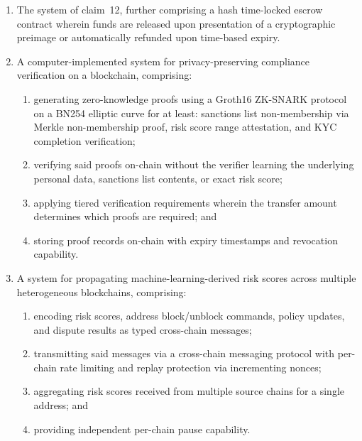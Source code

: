 \documentclass[12pt,a4paper]{article}
\begin{document}
\begin{enumerate}[label=\textbf{\arabic*.}, leftmargin=2em]
\item The system of claim~12, further comprising a hash time-locked escrow
contract wherein funds are released upon presentation of a cryptographic
preimage or automatically refunded upon time-based expiry.

\item A computer-implemented system for privacy-preserving compliance
verification on a blockchain, comprising:
\begin{enumerate}[label=(\alph*)]
  \item generating zero-knowledge proofs using a Groth16 ZK-SNARK protocol
    on a BN254 elliptic curve for at least: sanctions list non-membership via
    Merkle non-membership proof, risk score range attestation, and KYC
    completion verification;
  \item verifying said proofs on-chain without the verifier learning the
    underlying personal data, sanctions list contents, or exact risk score;
  \item applying tiered verification requirements wherein the transfer amount
    determines which proofs are required; and
  \item storing proof records on-chain with expiry timestamps and revocation
    capability.
\end{enumerate}

\item A system for propagating machine-learning-derived risk scores across
multiple heterogeneous blockchains, comprising:
\begin{enumerate}[label=(\alph*)]
  \item encoding risk scores, address block/unblock commands, policy updates,
    and dispute results as typed cross-chain messages;
  \item transmitting said messages via a cross-chain messaging protocol with
    per-chain rate limiting and replay protection via incrementing nonces;
  \item aggregating risk scores received from multiple source chains for a
    single address; and
  \item providing independent per-chain pause capability.
\end{enumerate}


\end{enumerate}
\end{document}
